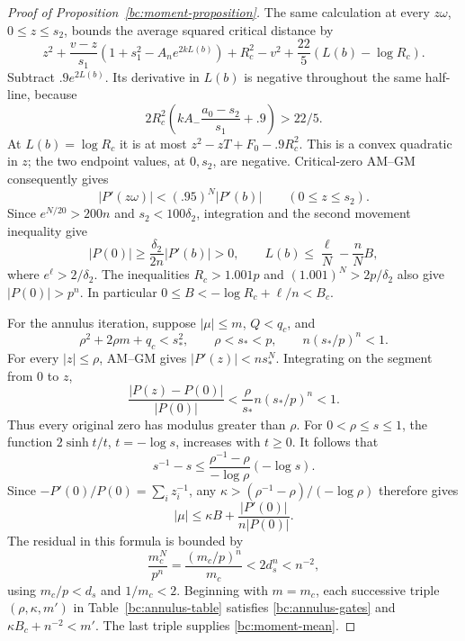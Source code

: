 \documentclass[11pt,reqno]{amsart}
\numberwithin{equation}{section}
\theoremstyle{definition}
\theoremstyle{remark}
\begin{document}
\begin{proof}[Proof of Proposition~\ref{bc:moment-proposition}]
The same calculation at every $z\omega$, $0\leq z\leq s_2$, bounds
the average squared critical distance by
\[
 z^2+\frac{v-z}{s_1}(1+s_1^2-A_ne^{2kL(b)})+R_c^2-v^2
       +\frac{22}5(L(b)-\log R_c).
\]
Subtract $.9e^{2L(b)}$.  Its derivative in $L(b)$ is negative
throughout the same half-line, because
\[
 2R_c^2\left(kA_-\frac{a_0-s_2}{s_1}+.9\right)>22/5.
\]
At $L(b)=\log R_c$ it is at most
$z^2-zT+F_0-.9R_c^2$.  This is a convex quadratic in $z$;
the two endpoint values, at $0,s_2$, are negative.
Critical-zero AM--GM consequently gives
\begin{equation}\label{bc:primitive-decay}
 |P'(z\omega)|<(.95)^N|P'(b)|\qquad(0\leq z\leq s_2).
\end{equation}
Since $e^{N/20}>200n$ and $s_2<100\delta_2$, integration and the
second movement inequality give
\begin{equation}\label{bc:normalization}
 |P(0)|\geq\frac{\delta_2}{2n}|P'(b)|>0,
 \qquad
 L(b)\leq\frac\ell N-\frac nN B,
\end{equation}
where $e^\ell>2/\delta_2$.  The inequalities
$R_c>1.001p$ and $(1.001)^N>2p/\delta_2$ also give
$|P(0)|>p^n$.  In particular
$0\leq B< -\log R_c+\ell/n<B_c$.

For the annulus iteration, suppose $|\mu|\leq m$,
$Q<q_c$, and
\begin{equation}\label{bc:annulus-gates}
 \rho^2+2\rho m+q_c<s_*^2,\qquad
 \rho<s_*<p,\qquad n(s_*/p)^n<1.
\end{equation}
For every $|z|\leq\rho$, AM--GM gives
$|P'(z)|<ns_*^{N}$.  Integrating on the segment from $0$ to $z$,
\[
 \frac{|P(z)-P(0)|}{|P(0)|}
 <\frac\rho{s_*}n(s_*/p)^n<1.
\]
Thus every original zero has modulus greater than $\rho$.
For $0<\rho\leq s\leq1$, the function
$2\sinh t/t$, $t=-\log s$, increases with $t\geq0$.
It follows that
\[
 s^{-1}-s\leq
 \frac{\rho^{-1}-\rho}{-\log\rho}(-\log s).
\]
Since $-P'(0)/P(0)=\sum_i z_i^{-1}$, any
$\kappa>(\rho^{-1}-\rho)/(-\log\rho)$ therefore gives
\begin{equation}\label{bc:reciprocal-mean}
 |\mu|\leq\kappa B+
 \frac{|P'(0)|}{n|P(0)|}.
\end{equation}
The residual in this formula is bounded by
\[
 \frac{m_c^N}{p^n}=\frac{(m_c/p)^n}{m_c}<2d_s^n<n^{-2},
\]
using $m_c/p<d_s$ and $1/m_c<2$.
Beginning with $m=m_c$,
each successive triple $(\rho,\kappa,m')$ in
Table~\ref{bc:annulus-table} satisfies \eqref{bc:annulus-gates}
and $\kappa B_c+n^{-2}<m'$.  The last triple supplies
\eqref{bc:moment-mean}.


\end{proof}
\end{document}
